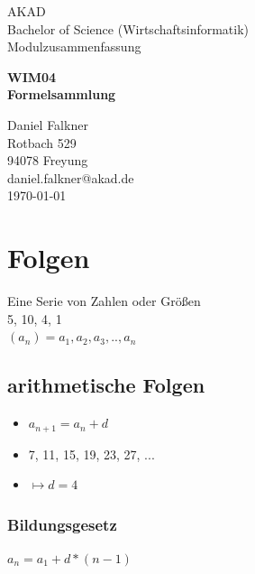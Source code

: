 \documentclass[a4paper,12pt]{scrartcl}
\begin{document}
\begin{titlepage}
\begin{small}
\vfill {AKAD\\ 
Bachelor of Science (Wirtschaftsinformatik) \\ 
Modulzusammenfassung}
\end{small}


\begin{center}
\begin{Large}
\vfill {\textsf{\textbf{
WIM04 \\
\vspace*{1cm} 
Formelsammlung
}}}
\end{Large}
\end{center}

\begin{small}
\vfill Daniel Falkner \\ Rotbach 529 \\  94078 Freyung \\  daniel.falkner@akad.de \\ 
\today
\end{small}

\end{titlepage}


\tableofcontents
\thispagestyle{empty}

\clearpage

\onehalfspacing

\pagestyle{plain}


\section{Folgen}
Eine Serie von Zahlen oder Größen \\
5, 10, 4, 1 \\
$(a_n) = a_1, a_2, a_3, .., a_n$
\subsection{arithmetische Folgen}
\begin{itemize}
\item $a_{n+1} = a_n + d$ 
\item 7, 11, 15, 19, 23, 27, ... 
\item $\mapsto d = 4$ 
\end{itemize}

\subsubsection{Bildungsgesetz}
$a_n = a_1 + d * (n - 1)$
\end{document}
